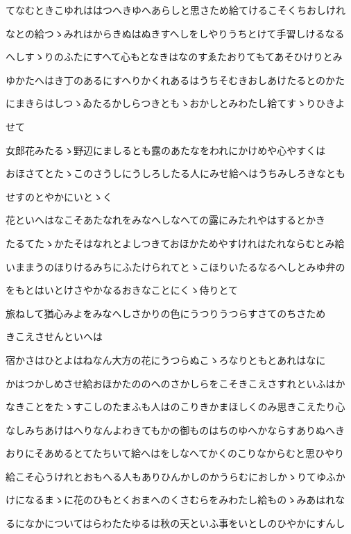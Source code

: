 \documentclass[a4paper,11pt,landscape]{ltjtarticle}
\begin{document}
\par\medskip
てなむときこゆれははつへきゆへあらしと思さため給てけるこそくちおしけれ
\par\medskip
なとの給つゝみれはからきぬはぬきすへしをしやりうちとけて手習しけるなる
\par\medskip
へしすゝりのふたにすへて心もとなきはなのすゑたおりてもてあそひけりとみ
\par\medskip
ゆかたへはき丁のあるにすへりかくれあるはうちそむきおしあけたるとのかた
\par\medskip
にまきらはしつゝゐたるかしらつきともゝおかしとみわたし給てすゝりひきよ
\par\medskip
せて
\par\medskip
女郎花みたるゝ野辺にましるとも露のあたなをわれにかけめや心やすくは
\par\medskip
おほさてとたゝこのさうしにうしろしたる人にみせ給へはうちみしろきなとも
\par\medskip
せすのとやかにいとゝく
\par\medskip
花といへはなこそあたなれをみなへしなへての露にみたれやはするとかき
\par\medskip
たるてたゝかたそはなれとよしつきておほかためやすけれはたれならむとみ給
\par\medskip
いままうのほりけるみちにふたけられてとゝこほりいたるなるへしとみゆ弁の
\par\medskip
をもとはいとけさやかなるおきなことにくゝ侍りとて
\par\medskip
旅ねして猶心みよをみなへしさかりの色にうつりうつらすさてのちさため
\par\medskip
きこえさせんといへは
\par\medskip
宿かさはひとよはねなん大方の花にうつらぬこゝろなりともとあれはなに
\par\medskip
かはつかしめさせ給おほかたののへのさかしらをこそきこえさすれといふはか
\par\medskip
なきことをたゝすこしのたまふも人はのこりきかまほしくのみ思きこえたり心
\par\medskip
なしみちあけはへりなんよわきてもかの御ものはちのゆへかならすありぬへき
\par\medskip
おりにそあめるとてたちいて給へはをしなへてかくのこりなからむと思ひやり
\par\medskip
給こそ心うけれとおもへる人もありひんかしのかうらむにおしかゝりてゆふか
\par\medskip
けになるまゝに花のひもとくおまへのくさむらをみわたし給ものゝみあはれな
\par\medskip
るになかについてはらわたたゆるは秋の天といふ事をいとしのひやかにすんし
\end{document}
